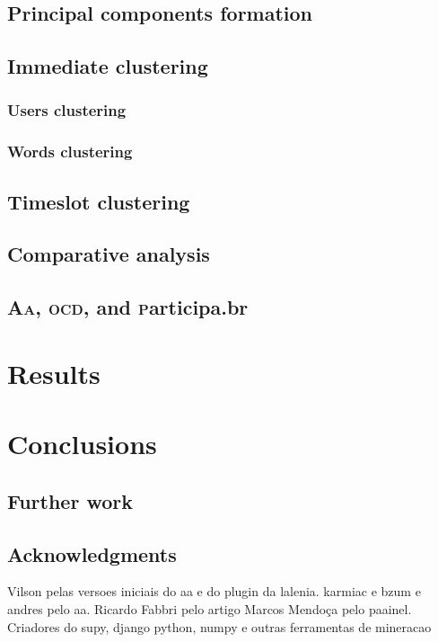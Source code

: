 \documentclass[a4paper, 11pt]{article} %
\newcommand{\ocd}{\textsc{ocd}}
\newcommand{\participa}{\textsc{p}articipa.br}
\newcommand{\aab}{\textsc{aa}}
\newcommand{\aai}{\textsc{Aa}}
\newcommand{\ontologiaa}{\textsc{o}ntologi\textsc{aa}}
\begin{document}
\subsection{Principal components formation}
\subsection{Immediate clustering}
\subsubsection{Users clustering}
\subsubsection{Words clustering}
\subsection{Timeslot clustering}
\subsection{Comparative analysis}
\subsection{\aai, \ocd, and \participa}

\section{Results}\label{sec:res}

\section{Conclusions}\label{sec:con}
\subsection{Further work}
\subsection{Acknowledgments}
Vilson pelas versoes iniciais do aa e do plugin da lalenia.
karmiac e bzum e andres pelo aa.
Ricardo Fabbri pelo artigo
Marcos Mendoça pelo paainel.
Criadores do supy, django python, numpy e outras ferramentas de mineracao


\end{document}
